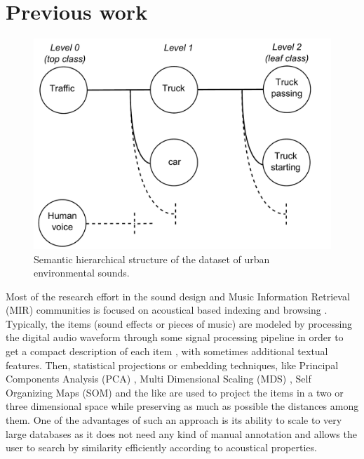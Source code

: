 \documentclass{aes2e}
\begin{document}
\section{Previous work} \label{previous}



\begin{figure}[t]
\begin{center}
\includegraphics[scale=0.24]{gfx/dataset.pdf} 
\end{center}
\caption{\label{figdataset} Semantic hierarchical structure of the dataset of urban environmental sounds.}
\end{figure}


Most of the research effort in the sound design and Music Information Retrieval (MIR) communities is focused on acoustical based indexing and browsing \cite{tzanetakis2003musescape, streich2008music,goto2005musicream,pampalk2007musicsun}. Typically, the items (sound effects or pieces of music) are modeled by processing the digital audio waveform through some signal processing pipeline in order to get a compact description of each item
\cite{coleman2007mused}, with sometimes additional textual features. Then, statistical projections or embedding techniques, like Principal Components Analysis (PCA) \cite{MusicBox},  Multi Dimensional Scaling (MDS) \cite{schwarz2009sound,Cano2002}, Self Organizing Maps (SOM) \cite{pampalk2004exploring,pampalk2006musicrainbow,knees2006innovative} and the like are used to project the items in a two or three dimensional space while preserving as much as possible the distances among them. One of the advantages of such an approach is its ability to scale to very large databases \cite{schwarz2009scalability} as it does not need any kind of manual annotation and allows the user to search by similarity efficiently according to acoustical properties.
\end{document}
